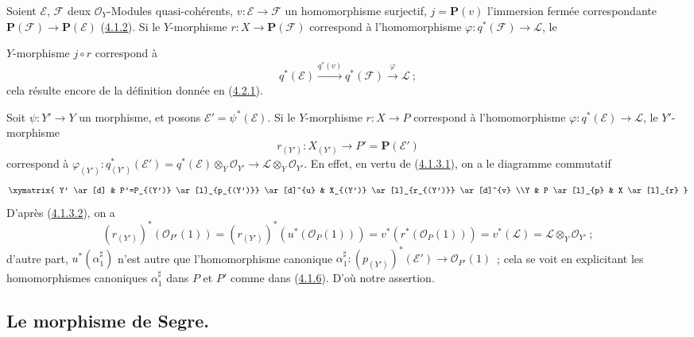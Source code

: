 \begin{env}[4.2.9]
\label{II.4.2.9-fr}
Soient $\mathcal{E}$, $\mathcal{F}$ deux $\mathcal{O}_Y$-Modules
quasi-cohérents, $v:\mathcal{E}\to\mathcal{F}$ un homomorphisme surjectif,
$j=\mathbf{P}(v)$ l'immersion fermée correspondante
$\mathbf{P}(\mathcal{F})\to\mathbf{P}(\mathcal{E})$
(\hyperref[II.4.1.2-fr]{4.1.2}). Si le $Y$-morphisme
$r:X\to\mathbf{P}(\mathcal{F})$ correspond à l'homomorphisme
$\varphi:q^*(\mathcal{F})\to\mathcal{L}$, le


$Y$-morphisme $j\circ r$ correspond à
\[
  q^*(\mathcal{E})\xrightarrow{q^*(v)}q^*(\mathcal{F})
  \xrightarrow{\varphi}\mathcal{L}~;
\]
cela résulte encore de la définition donnée en
(\hyperref[II.4.2.1-fr]{4.2.1}).
\end{env}

\begin{env}[4.2.10]
\label{II.4.2.10-fr}
Soit $\psi:Y'\to Y$ un morphisme, et posons
$\mathcal{E}'=\psi^*(\mathcal{E})$. Si le $Y$-morphisme $r:X\to P$ correspond
à l'homomorphisme $\varphi:q^*(\mathcal{E})\to\mathcal{L}$, le
$Y'$-morphisme
\[
  r_{(Y')}:X_{(Y')}\longrightarrow P'=\mathbf{P}(\mathcal{E}')
\]
correspond à
$\varphi_{(Y')}:q_{(Y')}^*(\mathcal{E}')=
  q^*(\mathcal{E})\otimes_Y\mathcal{O}_{Y'}\to
\mathcal{L}\otimes_Y\mathcal{O}_{Y'}$. En effet, en vertu de
(\hyperref[II.4.1.3.1-fr]{4.1.3.1}), on a le diagramme commutatif
\[
  \xymatrix{
    Y' \ar[d]
    & P'=P_{(Y')} \ar[l]_{p_{(Y')}} \ar[d]^{u}
    & X_{(Y')} \ar[l]_{r_{(Y')}} \ar[d]^{v}
    \\Y
    & P \ar[l]_{p}
    & X \ar[l]_{r}
  }
\]
D'après (\hyperref[II.4.1.3.2-fr]{4.1.3.2}), on a
\[
  (r_{(Y')})^*(\mathcal{O}_{P'}(1))
  =(r_{(Y')})^*(u^*(\mathcal{O}_P(1)))
  =v^*(r^*(\mathcal{O}_P(1)))
  =v^*(\mathcal{L})=\mathcal{L}\otimes_Y\mathcal{O}_{Y'}~;
\]
d'autre part, $u^*(\alpha_1^\sharp)$ n'est autre que l'homomorphisme
canonique
$\alpha_1^\sharp:(p_{(Y')})^*(\mathcal{E}')\to\mathcal{O}_{P'}(1)$~; cela
se voit en explicitant les homomorphismes canoniques $\alpha_1^\sharp$ dans
$P$ et $P'$ comme dans (\hyperref[II.4.1.6-fr]{4.1.6}). D'où notre assertion.
\end{env}

\subsection{Le morphisme de Segre.}
\label{subsection:II.4.3-fr}

